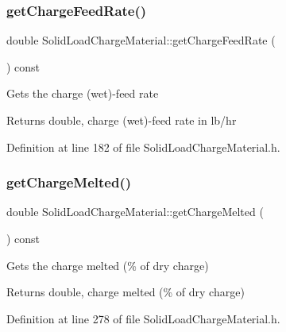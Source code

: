 \subsubsection{\texorpdfstring{get\+Charge\+Feed\+Rate()}{getChargeFeedRate()}}
{\footnotesize\ttfamily double Solid\+Load\+Charge\+Material\+::get\+Charge\+Feed\+Rate (\begin{DoxyParamCaption}{ }\end{DoxyParamCaption}) const\hspace{0.3cm}{\ttfamily [inline]}}

Gets the charge (wet)-\/feed rate \begin{DoxyReturn}{Returns}
double, charge (wet)-\/feed rate in lb/hr 
\end{DoxyReturn}


Definition at line 182 of file Solid\+Load\+Charge\+Material.\+h.

\mbox{\label{class_solid_load_charge_material_ad9ab52fe5861f48b763fe300851df69a}} 
\subsubsection{\texorpdfstring{get\+Charge\+Melted()}{getChargeMelted()}}
{\footnotesize\ttfamily double Solid\+Load\+Charge\+Material\+::get\+Charge\+Melted (\begin{DoxyParamCaption}{ }\end{DoxyParamCaption}) const\hspace{0.3cm}{\ttfamily [inline]}}

Gets the charge melted (\% of dry charge) \begin{DoxyReturn}{Returns}
double, charge melted (\% of dry charge) 
\end{DoxyReturn}


Definition at line 278 of file Solid\+Load\+Charge\+Material.\+h.

\mbox{\label{class_solid_load_charge_material_afcb8c00c2e23ad1444f34960b19835a0}} 
